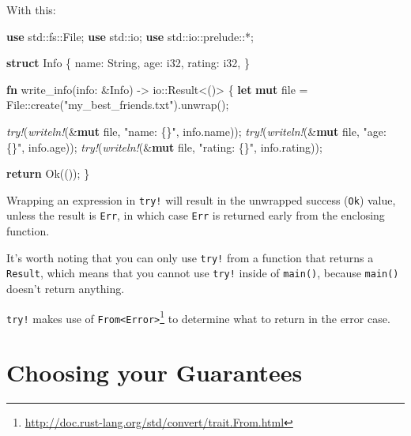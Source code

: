 \documentclass[a4paper,]{book}
\newenvironment{Shaded}{\begin{snugshade}}{\end{snugshade}}
\newcommand{\KeywordTok}[1]{\textcolor[rgb]{0.13,0.29,0.53}{\textbf{{#1}}}}
\newcommand{\DataTypeTok}[1]{\textcolor[rgb]{0.13,0.29,0.53}{{#1}}}
\newcommand{\ConstantTok}[1]{\textcolor[rgb]{0.00,0.00,0.00}{{#1}}}
\newcommand{\StringTok}[1]{\textcolor[rgb]{0.31,0.60,0.02}{{#1}}}
\newcommand{\PreprocessorTok}[1]{\textcolor[rgb]{0.56,0.35,0.01}{\textit{{#1}}}}
\newcommand{\NormalTok}[1]{{#1}}
\renewcommand{\href}[2]{#2\footnote{\url{#1}}}
\begin{document}
With this:

\begin{Shaded}
\begin{Highlighting}[]
\KeywordTok{use} \NormalTok{std::fs::File;}
\KeywordTok{use} \NormalTok{std::io;}
\KeywordTok{use} \NormalTok{std::io::prelude::*;}

\KeywordTok{struct} \NormalTok{Info \{}
    \NormalTok{name: }\DataTypeTok{String}\NormalTok{,}
    \NormalTok{age: }\DataTypeTok{i32}\NormalTok{,}
    \NormalTok{rating: }\DataTypeTok{i32}\NormalTok{,}
\NormalTok{\}}

\KeywordTok{fn} \NormalTok{write_info(info: &Info) -> io::}\DataTypeTok{Result}\NormalTok{<()> \{}
    \KeywordTok{let} \KeywordTok{mut} \NormalTok{file = File::create(}\StringTok{"my_best_friends.txt"}\NormalTok{).unwrap();}

    \PreprocessorTok{try!}\NormalTok{(}\PreprocessorTok{writeln!}\NormalTok{(&}\KeywordTok{mut} \NormalTok{file, }\StringTok{"name: \{\}"}\NormalTok{, info.name));}
    \PreprocessorTok{try!}\NormalTok{(}\PreprocessorTok{writeln!}\NormalTok{(&}\KeywordTok{mut} \NormalTok{file, }\StringTok{"age: \{\}"}\NormalTok{, info.age));}
    \PreprocessorTok{try!}\NormalTok{(}\PreprocessorTok{writeln!}\NormalTok{(&}\KeywordTok{mut} \NormalTok{file, }\StringTok{"rating: \{\}"}\NormalTok{, info.rating));}

    \KeywordTok{return} \ConstantTok{Ok}\NormalTok{(());}
\NormalTok{\}}
\end{Highlighting}
\end{Shaded}

Wrapping an expression in \texttt{try!} will result in the unwrapped
success (\texttt{Ok}) value, unless the result is \texttt{Err}, in which
case \texttt{Err} is returned early from the enclosing function.

It's worth noting that you can only use \texttt{try!} from a function
that returns a \texttt{Result}, which means that you cannot use
\texttt{try!} inside of \texttt{main()}, because \texttt{main()} doesn't
return anything.

\texttt{try!} makes use of
\href{http://doc.rust-lang.org/std/convert/trait.From.html}{\texttt{From\textless{}Error\textgreater{}}}
to determine what to return in the error case.

\section{Choosing your Guarantees}\label{sec--choosing-your-guarantees}
\end{document}
